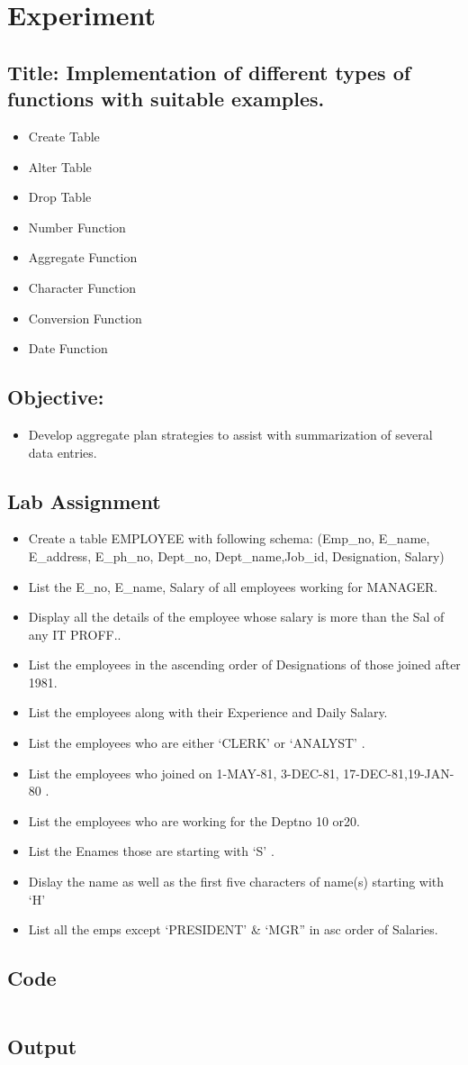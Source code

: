 \documentclass{article}
\begin{document}
\section*{Experiment \jobname}
\subsection*{\textbf{Title:} Implementation of different types of functions with suitable examples.}
\begin{itemize}
	\item Create Table
	\item Alter Table
	\item Drop Table
	\item Number Function
	\item Aggregate Function
	\item Character Function
	\item Conversion Function
	\item Date Function
\end{itemize}
\subsection*{\textbf{Objective:}}
\begin{itemize}
	\item Develop aggregate plan strategies to assist with summarization of several data entries.
\end{itemize}
\subsection*{Lab Assignment}
\begin{itemize}
	\item Create a table EMPLOYEE with following schema: (Emp_no, E_name, E_address, E_ph_no, Dept_no, Dept_name,Job_id, Designation, Salary)
	\item List the E_no, E_name, Salary of all employees working for MANAGER.
	\item Display all the details of the employee whose salary is more than the Sal of any IT PROFF..
	\item List the employees in the ascending order of Designations of those joined after 1981.
	\item List the employees along with their Experience and Daily Salary.
	\item List the employees who are either ‘CLERK’ or ‘ANALYST’ .
	\item List the employees who joined on 1-MAY-81, 3-DEC-81, 17-DEC-81,19-JAN-80 .
	\item List the employees who are working for the Deptno 10 or20.
	\item List the Enames those are starting with ‘S’ .
	\item Dislay the name as well as the first five characters of name(s) starting with ‘H’
	\item  List all the emps except ‘PRESIDENT’ \& ‘MGR” in asc order of Salaries.
\end{itemize}
\subsection*{Code}
\inputminted{sql}{code/\jobname.sql}
\subsection*{Output}

\end{document}
